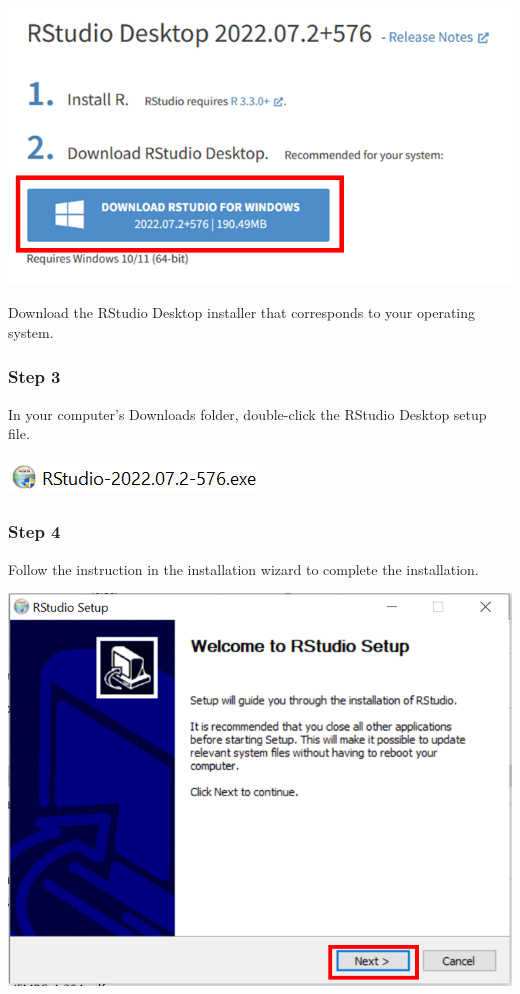 \documentclass[
  letterpaper,
  DIV=11,
  numbers=noendperiod,
  oneside]{scrreprt}
\begin{document}
\includegraphics{./images/paste-027BCBD8.png}

Download the RStudio Desktop installer that corresponds to your
operating system.

\hypertarget{step-3-2}{%
\subsubsection{Step 3}\label{step-3-2}}

In your computer's Downloads folder, double-click the RStudio Desktop
setup file.

\includegraphics{./images/paste-31A16011.png}

\hypertarget{step-4-1}{%
\subsubsection{Step 4}\label{step-4-1}}

Follow the instruction in the installation wizard to complete the
installation.

\includegraphics{./images/paste-427EA827.png}
\end{document}
